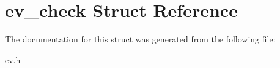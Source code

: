 \hypertarget{structev__check}{}\section{ev\+\_\+check Struct Reference}
\label{structev__check}


The documentation for this struct was generated from the following file\+:\begin{DoxyCompactItemize}
\item 
ev.\+h\end{DoxyCompactItemize}
